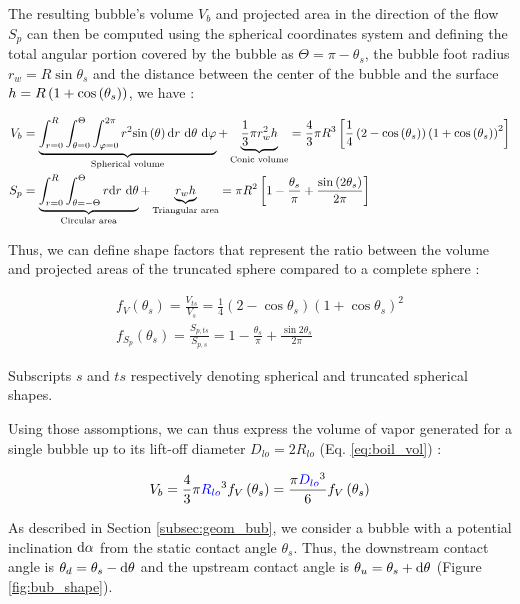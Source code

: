 The resulting bubble's volume $V_{b}$ and projected area in the direction of the flow $S_{p}$ can then be computed using the spherical coordinates system and defining the total angular portion covered by the bubble as $\Theta = \pi - \theta_{s}$, the bubble foot radius $r_{w}=R \sin{\theta_{s}}$ and the distance between the center of the bubble and the surface $h=R\left( 1+\mathrm{cos}\left( \theta_{s} \right) \right)$, we have :

\begin{align}
V_{b} &= \underbrace{ \int_{r=0}^{R} \int_{\theta=0}^{\Theta} \int_{\varphi=0}^{2\pi} r^{2}\mathrm{sin}\left( \theta \right) \text{d}r ~\text{d}\theta~ \text{d}\varphi }_{\text{Spherical volume}}+ \underbrace {\frac{1}{3}\pi r_{w}^{2}h}_{\text{Conic volume}}
=\frac{4}{3}\pi R^{3} \left[  \frac{1}{4} \left( 2-\mathrm{cos}\left( \theta_{s} \right) \right)\left( 1+\mathrm{cos}\left( \theta_{s} \right) \right)^{2}  \right] \\
S_{p}&= \underbrace{\int_{r=0}^{R}\int_{\theta=-\Theta}^{\Theta}r \text{d}r ~ \text{d}\theta}_{\text{Circular area}} + \underbrace{r_{w}h}_{\text{Triangular area}} = \pi R^{2} \left[ 1-\frac{\theta_{s}}{\pi} + \frac{\mathrm{sin}\left( 2\theta_{s} \right)}{2\pi}  \right] 
\end{align}


Thus, we can define shape factors that represent the ratio between the volume and projected areas of the truncated sphere compared to a complete sphere : 

\begin{align}
f_{V}\left(\theta_{s}\right)=\frac{V_{ts}}{V_{s}}=\frac{1}{4}\left(2-\cos{\theta_{s}}\right)\left(1+\cos{\theta_{s}}\right)^{2}\\
f_{S_{p}}\left(\theta_{s}\right)=\frac{S_{p,ts}}{S_{p,s}}=1-\frac{\theta_{s}}{\pi}+\frac{\sin{2\theta_{s}}}{2\pi}
\end{align}

Subscripts $s$ and $ts$ respectively denoting spherical and truncated spherical shapes.


\npar

Using those assomptions, we can thus express the volume of vapor generated for a single bubble up to its lift-off diameter $D_{lo}=2R_{lo}$ (Eq. \ref{eq:boil_vol}) :

\begin{align}
\label{eq:boil_vol}
V_{b}=\frac{4}{3}\pi \bluemath{R_{lo}}^{3} f_{V}\parth{\theta_{s}} = \frac{\pi \bluemath{D_{lo}}^{3}}{6} f_{V}\parth{\theta_{s}}
\end{align}

As described in Section \ref{subsec:geom_bub}, we consider a bubble with a potential inclination $\text{d}\alpha$ from the static contact angle $\theta_{s}$. Thus, the downstream contact angle is $\theta_{d}=\theta_{s} - \mathrm{d}\theta$ and the upstream contact angle is $\theta_{u}=\theta_{s} + \mathrm{d}\theta$ (Figure \ref{fig:bub_shape}).

